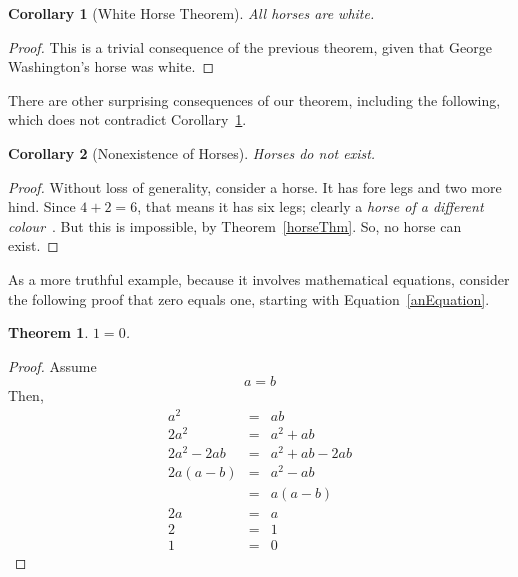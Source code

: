 \documentclass{article}
\newcommand*{\thmref}[1]{{Theorem~\ref{#1}}}
\newcommand*{\corref}[1]{{Corollary~\ref{#1}}}
\newcommand*{\eqnref}[1]{{Equation~\ref{#1}}}
\newtheorem{thm}{Theorem}
\newtheorem{cor}{Corollary}
\begin{document}
\begin{cor}[White Horse Theorem]\label{whiteHorses}
All horses are white.
\end{cor}
\begin{proof}
This is a trivial consequence of the previous theorem, given that George Washington's horse was white.
\end{proof}

There are other surprising consequences of our theorem, including the following, which does not contradict \corref{whiteHorses}.

\begin{cor}[Nonexistence of Horses]
Horses do not exist.
\end{cor}
\begin{proof}
Without loss of generality, consider a horse.  It has fore legs and two more hind.  Since $4+2=6$, that means it has six legs; clearly a \emph{horse of a different colour}~\cite{idiom}.  But this is impossible, by \thmref{horseThm}.  So, no horse can exist.
\end{proof}

As a more truthful example, because it involves mathematical equations, consider the following proof that zero equals one, starting with \eqnref{anEquation}.

\begin{thm}
$1 = 0$.
\end{thm}
\begin{proof}
Assume
\begin{equation}\label{anEquation}
  a = b
\end{equation}
Then,
\begin{eqnarray*}
       a^2 & = & ab \\
      2a^2 & = & a^2 + ab \\
2a^2 - 2ab & = & a^2 + ab - 2ab \\
  2a (a-b) & = & a^2 - ab \\
           & = & a (a-b) \\
        2a & = & a \\
         2 & = & 1 \\
         1 & = & 0
\end{eqnarray*}
\end{proof}
\end{document}
